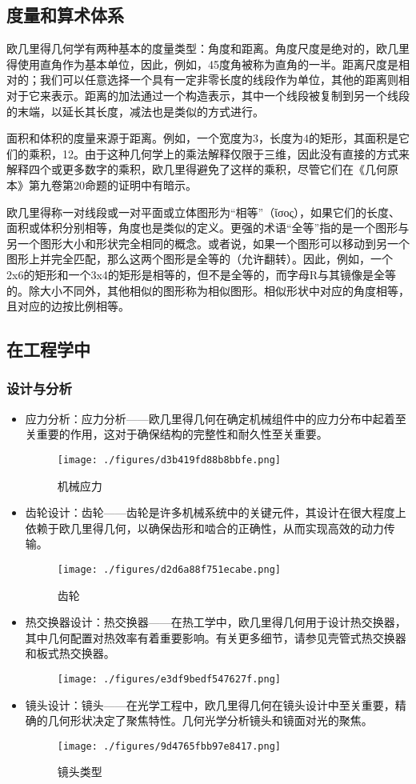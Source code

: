 \subsection{度量和算术体系}  
欧几里得几何学有两种基本的度量类型：角度和距离。角度尺度是绝对的，欧几里得使用直角作为基本单位，因此，例如，45度角被称为直角的一半。距离尺度是相对的；我们可以任意选择一个具有一定非零长度的线段作为单位，其他的距离则相对于它来表示。距离的加法通过一个构造表示，其中一个线段被复制到另一个线段的末端，以延长其长度，减法也是类似的方式进行。

面积和体积的度量来源于距离。例如，一个宽度为3，长度为4的矩形，其面积是它们的乘积，12。由于这种几何学上的乘法解释仅限于三维，因此没有直接的方式来解释四个或更多数字的乘积，欧几里得避免了这样的乘积，尽管它们在《几何原本》第九卷第20命题的证明中有暗示。

欧几里得称一对线段或一对平面或立体图形为“相等”（ἴσος），如果它们的长度、面积或体积分别相等，角度也是类似的定义。更强的术语“全等”指的是一个图形与另一个图形大小和形状完全相同的概念。或者说，如果一个图形可以移动到另一个图形上并完全匹配，那么这两个图形是全等的（允许翻转）。因此，例如，一个2x6的矩形和一个3x4的矩形是相等的，但不是全等的，而字母R与其镜像是全等的。除大小不同外，其他相似的图形称为相似图形。相似形状中对应的角度相等，且对应的边按比例相等。
\subsection{在工程学中}  
\subsubsection{设计与分析}
\begin{itemize}
\item 应力分析：应力分析——欧几里得几何在确定机械组件中的应力分布中起着至关重要的作用，这对于确保结构的完整性和耐久性至关重要。
\begin{figure}[ht]
\centering
\texttt{[image: ./figures/d3b419fd88b8bbfe.png]}
\caption{机械应力} \label{fig_OJLJH_10}
\end{figure}
\item 齿轮设计：齿轮——齿轮是许多机械系统中的关键元件，其设计在很大程度上依赖于欧几里得几何，以确保齿形和啮合的正确性，从而实现高效的动力传输。
\begin{figure}[ht]
\centering
\texttt{[image: ./figures/d2d6a88f751ecabe.png]}
\caption{齿轮} \label{fig_OJLJH_11}
\end{figure}
\item 热交换器设计：热交换器——在热工学中，欧几里得几何用于设计热交换器，其中几何配置对热效率有着重要影响。有关更多细节，请参见壳管式热交换器和板式热交换器。
\begin{figure}[ht]
\centering
\texttt{[image: ./figures/e3df9bedf547627f.png]}
\caption{} \label{fig_OJLJH_12}
\end{figure}
\item 镜头设计：镜头——在光学工程中，欧几里得几何在镜头设计中至关重要，精确的几何形状决定了聚焦特性。几何光学分析镜头和镜面对光的聚焦。
\begin{figure}[ht]
\centering
\texttt{[image: ./figures/9d4765fbb97e8417.png]}
\caption{镜头类型} \label{fig_OJLJH_13}
\end{figure}
\end{itemize}
